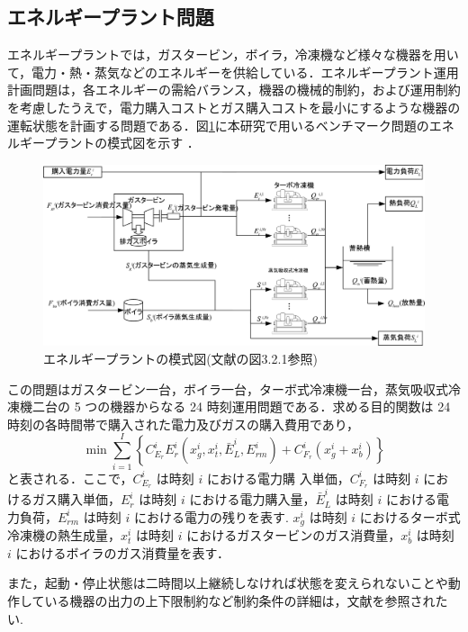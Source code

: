\documentclass[twocolumn]{jarticle}
\begin{document}
    \subsection{エネルギープラント問題}
    エネルギープラントでは，ガスタービン，ボイラ，冷凍機など様々な機器を用いて，電力・熱・蒸気などのエネルギーを供給している．エネルギープラント運用計画問題は，各エネルギーの需給バランス，機器の機械的制約，および運用制約を考慮したうえで，電力購入コストとガス購入コストを最小にするような機器の運転状態を計画する問題である．図\ref{energy_plant}に本研究で用いるベンチマーク問題のエネルギープラントの模式図を示す \cite{denki}．
    \begin{figure}[hbtp]
        \centering
        \includegraphics[keepaspectratio, scale=1.0]
            {energy_plant.png}
        \caption{エネルギープラントの模式図(文献\cite{denki}の図3.2.1参照)}
        \label{energy_plant}
       \end{figure}
    この問題はガスタービン一台，ボイラ一台，ターボ式冷凍機一台，蒸気吸収式冷凍機二台の 5 つの機器からなる 24 時刻運用問題である．求める目的関数は 24 時刻の各時間帯で購入された電力及びガスの購入費用であり，
    \begin{equation}
        \label{fitness}
        \min\sum_{i=1}^I\left\{C_{E_r}^iE_r^i(x_g^i, x_t^i, \bar{E}_L^i, E_{rm}^i) + C_{F_r}^i(x_g^i + x_b^i)\right\}
    \end{equation}
    と表される．ここで，$C_{E_r}^i$ は時刻 $i$ における電力購 入単価，$C_{F_r}^i$ は時刻 $i$ におけるガス購入単価，$E_r^i$ は時刻 $i$ における電力購入量，$\bar{E}_L^i$ は時刻 $i$ における電 力負荷，$E_{rm}^i$ は時刻 $i$ における電力の残りを表す. $x_g^i$ は時刻 $i$ におけるターボ式冷凍機の熱生成量，$x_t^i$ は時刻 $i$ におけるガスタービンのガス消費量，$x_b^i$ は時刻 $i$ におけるボイラのガス消費量を表す．
    
    また，起動・停止状態は二時間以上継続しなければ状態を変えられないことや動作している機器の出力の上下限制約など制約条件の詳細は，文献\cite{denki}を参照されたい.
\end{document}
